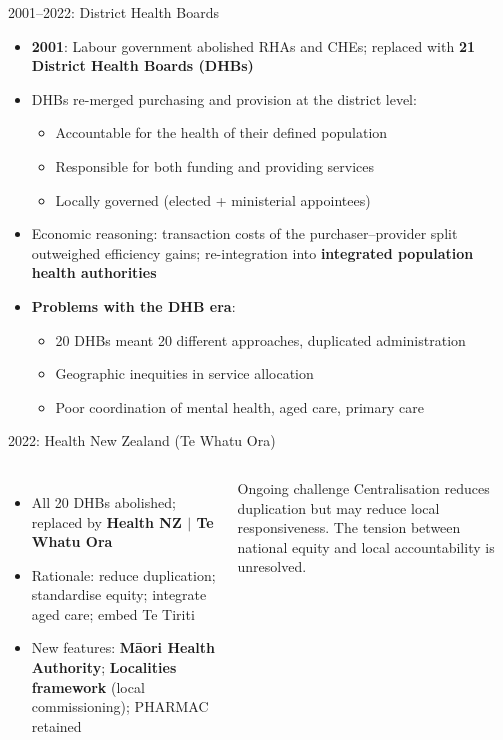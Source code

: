 \documentclass[aspectratio=169, 12pt]{beamer}
\begin{document}
\begin{frame}{2001--2022: District Health Boards}
  \begin{itemize}
    \item \textbf{2001}: Labour government abolished RHAs and CHEs; replaced with
          \textbf{21 District Health Boards (DHBs)}
    \item DHBs re-merged purchasing and provision at the district level:
    \begin{itemize}
      \item Accountable for the health of their defined population
      \item Responsible for both funding and providing services
      \item Locally governed (elected + ministerial appointees)
    \end{itemize}
    \item Economic reasoning: transaction costs of the purchaser--provider split outweighed
          efficiency gains; re-integration into \textbf{integrated population health authorities}
    \item \textbf{Problems with the DHB era}:
    \begin{itemize}
      \item 20 DHBs meant 20 different approaches, duplicated administration
      \item Geographic inequities in service allocation
      \item Poor coordination of mental health, aged care, primary care
    \end{itemize}
  \end{itemize}
\end{frame}

\begin{frame}{2022: Health New Zealand (Te Whatu Ora)}
  \begin{columns}
      \small
      \begin{itemize}
        \item All 20 DHBs abolished; replaced by \textbf{Health NZ $|$ Te Whatu Ora}
        \item Rationale: reduce duplication; standardise equity; integrate aged care; embed Te Tiriti
        \item New features: \textbf{M\=aori Health Authority}; \textbf{Localities framework} (local commissioning); PHARMAC retained
      \end{itemize}
      \begin{alertblock}{Ongoing challenge}
        \small Centralisation reduces duplication but may reduce local responsiveness. The tension between national equity and local accountability is unresolved.
      \end{alertblock}
  \end{columns}
\end{frame}
\end{document}
